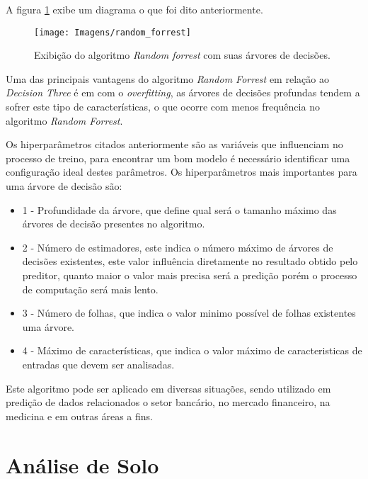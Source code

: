 \documentclass[
12pt,				%
oneside,			%
a4paper,			%
english,			%
french,				%
spanish,			%
brazil				%
]{abntex2}
\begin{document}
A figura \ref{figura:random_forrest} exibe um diagrama o que foi dito anteriormente. 

\begin{figure}[H]
	\caption{Exibição do algoritmo \textit{Random forrest} com suas árvores de decisões.}
	\centering %
	\texttt{[image: Imagens/random\_forrest]} %
	\label{figura:random_forrest}
\end{figure}
 
 
Uma das principais vantagens do algoritmo \textit{Random Forrest} em relação ao \textit{Decision Three} é em com o \textit{overfitting}, as árvores de decisões profundas tendem a sofrer este tipo de características, o que ocorre com menos frequência no algoritmo \textit{Random Forrest}.
 
Os hiperparâmetros citados anteriormente são as variáveis que influenciam no processo de treino, para encontrar um bom modelo é necessário identificar uma configuração ideal destes parâmetros. Os hiperparâmetros mais importantes para uma árvore de decisão são: 

\begin{itemize}
\item 1 - Profundidade da árvore, que define qual será o tamanho máximo das árvores de decisão presentes no algoritmo.

\item 2 - Número de estimadores, este indica o número máximo de árvores de decisões existentes, este valor influência diretamente no resultado obtido pelo preditor, quanto maior o valor mais precisa será a predição porém o processo de computação será mais lento. 

\item 3 - Número de folhas, que indica o  valor minimo possível de folhas existentes uma árvore.

\item 4 - Máximo de características, que indica o valor máximo de caracteristicas de entradas que devem ser analisadas.

\end{itemize}


Este algoritmo pode ser aplicado em diversas situações, sendo utilizado em predição de dados relacionados o setor bancário, no mercado financeiro, na medicina e em outras áreas a fins. 


\section{Análise de Solo}
\end{document}
